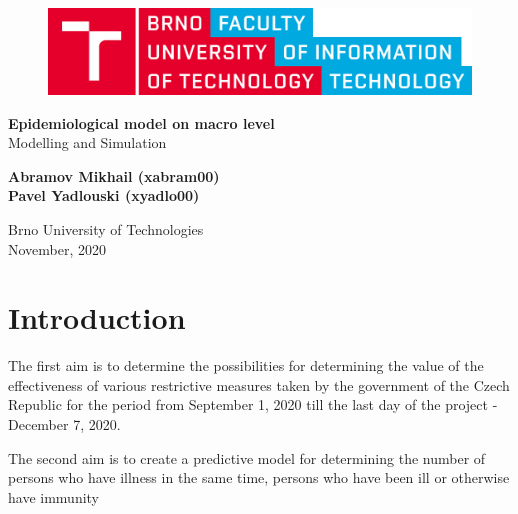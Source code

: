 \documentclass[12pt,a4paper,english]{article}
\newcommand{\todo}[1]{\textcolor{red}{[[\textbf{TODO} \textbf{#1]]}}}
\begin{document}
    \begin{titlepage}
        \begin{center}
            \vspace*{1cm}
        
            \begin{figure}[h!]
                \includegraphics[scale=0.12]{VUT-FIT-logo-en.png}
            \end{figure}
            \vspace{1.5cm}

            \Large{\textbf{Epidemiological model on macro level}} \\
            \large{Modelling and Simulation}

            \vspace{0.5cm}
                
            \vspace{1.5cm}
            
            \textbf{Abramov Mikhail (xabram00)} \\
            \textbf{Pavel Yadlouski (xyadlo00)} 

            \vfill
                
            \vspace{0.8cm}
        
            Brno University of Technologies\\
            November, 2020
                
        \end{center}
    \end{titlepage}

    \tableofcontents
    \newpage

    \section{Introduction}
    The first aim is to determine the possibilities for determining the value of the effectiveness of various restrictive measures taken by the government of the Czech Republic for the period from September 1, 2020 till the last day of the project - December 7, 2020.

    The second aim is to create a predictive model for determining the number of persons who have illness in the same time, persons who have been ill or otherwise have immunity
    
\end{document}
